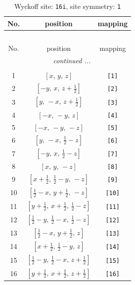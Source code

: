 \documentclass[fleqn,8pt]{jsarticle}
\begin{document}
\begin{longtable}{ccc}
\caption{Wyckoff site: {\tt 16i}, site symmetry: {\tt 1}}
 \\
 \hline \hline
No. & position & mapping \\ \hline \endfirsthead

\multicolumn{2}{l}{\tablename\ \thetable{}} \\
 \hline \hline
No. & position & mapping \\ \hline \endhead

 \hline \hline
\multicolumn{2}{r}{\footnotesize\it continued ...} \\ \endfoot

 \hline \hline
\multicolumn{2}{r}{} \\ \endlastfoot

1 & $\left[ x,\, y,\, z \right]$ & {\tt [1]} \\ \hline
2 & $\left[ - y,\, x,\, z + \frac{1}{2} \right]$ & {\tt [2]} \\ \hline
3 & $\left[ y,\, - x,\, z + \frac{1}{2} \right]$ & {\tt [3]} \\ \hline
4 & $\left[ - x,\, - y,\, z \right]$ & {\tt [4]} \\ \hline
5 & $\left[ - x,\, - y,\, - z \right]$ & {\tt [5]} \\ \hline
6 & $\left[ y,\, - x,\, \frac{1}{2} - z \right]$ & {\tt [6]} \\ \hline
7 & $\left[ - y,\, x,\, \frac{1}{2} - z \right]$ & {\tt [7]} \\ \hline
8 & $\left[ x,\, y,\, - z \right]$ & {\tt [8]} \\ \hline
9 & $\left[ x + \frac{1}{2},\, \frac{1}{2} - y,\, - z \right]$ & {\tt [9]} \\ \hline
10 & $\left[ \frac{1}{2} - x,\, y + \frac{1}{2},\, - z \right]$ & {\tt [10]} \\ \hline
11 & $\left[ y + \frac{1}{2},\, x + \frac{1}{2},\, \frac{1}{2} - z \right]$ & {\tt [11]} \\ \hline
12 & $\left[ \frac{1}{2} - y,\, \frac{1}{2} - x,\, \frac{1}{2} - z \right]$ & {\tt [12]} \\ \hline
13 & $\left[ \frac{1}{2} - x,\, y + \frac{1}{2},\, z \right]$ & {\tt [13]} \\ \hline
14 & $\left[ x + \frac{1}{2},\, \frac{1}{2} - y,\, z \right]$ & {\tt [14]} \\ \hline
15 & $\left[ \frac{1}{2} - y,\, \frac{1}{2} - x,\, z + \frac{1}{2} \right]$ & {\tt [15]} \\ \hline
16 & $\left[ y + \frac{1}{2},\, x + \frac{1}{2},\, z + \frac{1}{2} \right]$ & {\tt [16]} \\
\end{longtable}
\end{document}
